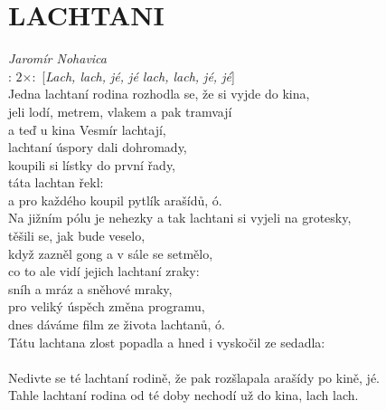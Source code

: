 \section*{\Huge LACHTANI}
\emph{Jaromír Nohavica}\\

\textregistered: $2\times:$ [\emph{Lach, lach, jé, jé lach, lach, jé, jé}]\\

Jedna lachtaní rodina rozhodla se, že si vyjde do kina,\\
jeli lodí, metrem, vlakem a pak tramvají\\
a teď u kina Vesmír lachtají,\\
lachtaní úspory dali dohromady,\\
koupili si lístky do první řady,\\
táta lachtan řekl: \\
a pro každého koupil pytlík arašídů, ó. \hspace{1cm} \textregistered\\

Na jižním pólu je nehezky a tak lachtani si vyjeli na grotesky,\\
těšili se, jak bude veselo,\\
když zazněl gong a v sále se setmělo,\\
co to ale vidí jejich lachtaní zraky:\\
sníh a mráz a sněhové mraky,\\
pro veliký úspěch změna programu,\\
dnes dáváme film ze života lachtanů, ó. \hspace{1cm} \textregistered\\

Tátu lachtana zlost popadla a hned i vyskočil ze sedadla:\\
\\
Nedivte se té lachtaní rodině, že pak rozšlapala arašídy po kině, jé. \textregistered\\

Tahle lachtaní rodina od té doby nechodí už do kina, lach lach. 

\newpage
